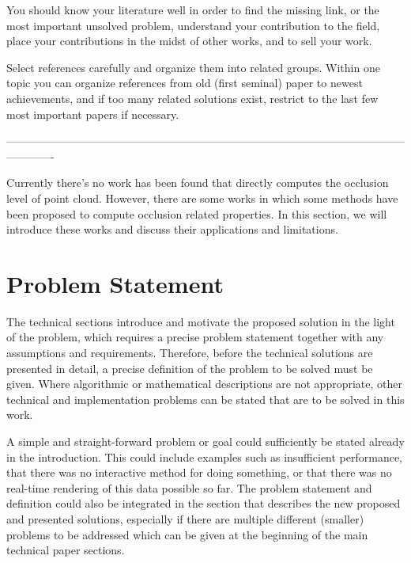\documentclass[11pt, a4paper,oneside,chapterprefix=false]{scrbook}
\begin{document}
You should know your literature well in order to find the missing link, or the most important unsolved problem, understand your contribution to the field, place your contributions in the midst of other works, and to sell your work.

Select references carefully and organize them into related groups. Within one topic you can organize references from old (first seminal) paper to newest achievements, and if too many related solutions exist, restrict to the last few most important papers if necessary.

-------------------------------------------------------------------------------------------------------------------------

Currently there's no work has been found that directly computes the occlusion level of point cloud. However, there are some works in which some methods have been proposed to compute occlusion related properties. In this section, we will introduce these works and discuss their applications and limitations.

\chapter{Problem Statement} \label{chp:problem}

The technical sections introduce and motivate the proposed solution in the light of the problem, which requires a precise problem statement together with any assumptions and requirements. Therefore, before the technical solutions are presented in detail, a precise definition of the problem to be solved must be given. Where algorithmic or mathematical descriptions are not appropriate, other technical and implementation problems can be stated that are to be solved in this work.

A simple and straight-forward problem or goal could sufficiently be stated already in the introduction. This could include examples such as insufficient performance, that there was no interactive method for doing something, or that there was no real-time rendering of this data possible so far. The problem statement and definition could also be integrated in the section that describes the new proposed and presented solutions, especially if there are multiple different (smaller) problems to be addressed which can be given at the beginning of the main technical paper sections.
\end{document}
